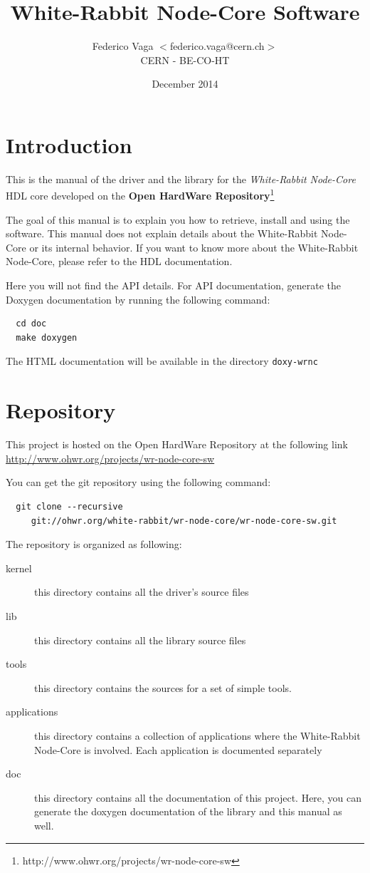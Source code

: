 \documentclass[a4paper,10pt]{article}
\title{White-Rabbit Node-Core Software}
\author{Federico Vaga $<$federico.vaga@cern.ch$>$\\CERN - BE-CO-HT}
\date{December 2014}
\begin{document}
\setlength{\parindent}{0cm}
\setlength{\parskip}{3mm}
\maketitle
{}

\section{Introduction}
This is the manual of the driver and the library for the
\textit{White-Rabbit Node-Core} HDL core developed on the \textbf{Open
  HardWare Repository}\footnote{http://www.ohwr.org/projects/wr-node-core-sw}

The goal of this manual is to explain you how to retrieve, install
and using the software. This manual does not explain details about
the White-Rabbit Node-Core or its internal behavior. If you want to
know more about the White-Rabbit Node-Core, please refer to the HDL
documentation.

Here you will not find the API details. For API documentation,
generate the Doxygen documentation by running the following command:

\begin{verbatim}
  cd doc
  make doxygen
\end{verbatim}

The HTML documentation will be available in the directory
\texttt{doxy-wrnc}

\section{Repository}%
This project is hosted on the Open HardWare Repository at the
following link \url{http://www.ohwr.org/projects/wr-node-core-sw}

You can get the git repository using the following command:
\begin{verbatim}
  git clone --recursive
     git://ohwr.org/white-rabbit/wr-node-core/wr-node-core-sw.git
\end{verbatim}

The repository is organized as following:
\begin{description}
  \item[kernel] this directory contains all the driver's source files
  \item[lib] this directory contains all the library source files
  \item[tools] this directory contains the sources for a set of simple
    tools.
  \item[applications] this directory contains a collection of
    applications where the White-Rabbit Node-Core is involved. Each
    application is documented separately
  \item[doc] this directory contains all the documentation of this
    project. Here, you can generate the doxygen documentation of the
    library and this manual as well.
\end{description}
\end{document}
